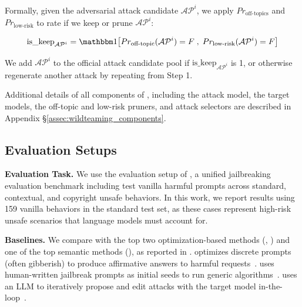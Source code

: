 Formally, given the adversarial attack candidate $\mathcal{AP}^i$, we apply $Pr_{\text{off-topics}}$ and $Pr_{\text{low-risk}}$ to rate if we keep or prune  $\mathcal{AP}^i$:


\vspace{-0.5cm}
\begin{align}
    \text{is\_keep}_{\mathcal{AP}^i} = \indic \big[ Pr_{\text{off-topic}}(\mathcal{AP}^i) = F \; , \; Pr_{\text{low-risk}}(\mathcal{AP}^i) = F \big] 
\end{align}
\vspace{-0.4cm}

We add $\mathcal{AP}^i$ to the official attack candidate pool if $\text{is\_keep}_{\mathcal{AP}^i}$ is 1, or otherwise regenerate another attack by repeating from Step 1.

Additional details of all components of \method, including the attack model, the target models, the off-topic and low-risk pruners, and attack selectors are described in Appendix \S \ref{assec:wildteaming_components}.

\subsection{Evaluation Setups}

\textbf{Evaluation Task.} 
We use the evaluation setup of \harmbench \citep{mazeika2024harmbench}, a unified jailbreaking evaluation benchmark including test vanilla harmful prompts across standard, contextual, and copyright unsafe behaviors. In this work, we report results using 159 vanilla behaviors in the standard test set, as these cases represent high-risk unsafe scenarios that language models must account for.

\textbf{Baselines.} We compare \method with the top two optimization-based methods (\gcg, \autodan) and one of the top semantic methods (\pair), as reported in \harmbench \citep{mazeika2024harmbench}. \gcg optimizes discrete prompts (often gibberish) to produce affirmative answers to harmful requests~\citep{gcg}. \autodan uses human-written jailbreak prompts as initial seeds to run generic algorithms~\citep{liu2023autodan}. \pair uses an LLM to iteratively propose and edit attacks with the target model in-the-loop~\citep{pair}.

